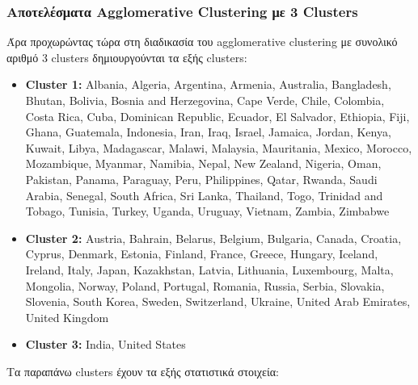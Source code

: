 \documentclass[12pt,a4paper]{article}
\begin{document}
\subsubsection{Αποτελέσματα Agglomerative Clustering με 3 Clusters}

Άρα προχωρώντας τώρα στη διαδικασία του agglomerative clustering με συνολικό αριθμό 3 clusters δημιουργούνται τα εξής clusters:

\begin{itemize}
    \item \textbf{Cluster 1:} Albania, Algeria, Argentina, Armenia, Australia, Bangladesh, Bhutan, Bolivia, Bosnia and Herzegovina, Cape Verde, Chile, Colombia, Costa Rica, Cuba, Dominican Republic, Ecuador, El Salvador, Ethiopia, Fiji, Ghana, Guatemala, Indonesia, Iran, Iraq, Israel, Jamaica, Jordan, Kenya, Kuwait, Libya, Madagascar, Malawi, Malaysia, Mauritania, Mexico, Morocco, Mozambique, Myanmar, Namibia, Nepal, New Zealand, Nigeria, Oman, Pakistan, Panama, Paraguay, Peru, Philippines, Qatar, Rwanda, Saudi Arabia, Senegal, South Africa, Sri Lanka, Thailand, Togo, Trinidad and Tobago, Tunisia, Turkey, Uganda, Uruguay, Vietnam, Zambia, Zimbabwe
    \item \textbf{Cluster 2:} Austria, Bahrain, Belarus, Belgium, Bulgaria, Canada, Croatia, Cyprus, Denmark, Estonia, Finland, France, Greece, Hungary, Iceland, Ireland, Italy, Japan, Kazakhstan, Latvia, Lithuania, Luxembourg, Malta, Mongolia, Norway, Poland, Portugal, Romania, Russia, Serbia, Slovakia, Slovenia, South Korea, Sweden, Switzerland, Ukraine, United Arab Emirates, United Kingdom
    \item \textbf{Cluster 3:} India, United States
\end{itemize}

Τα παραπάνω clusters έχουν τα εξής στατιστικά στοιχεία:
\end{document}
